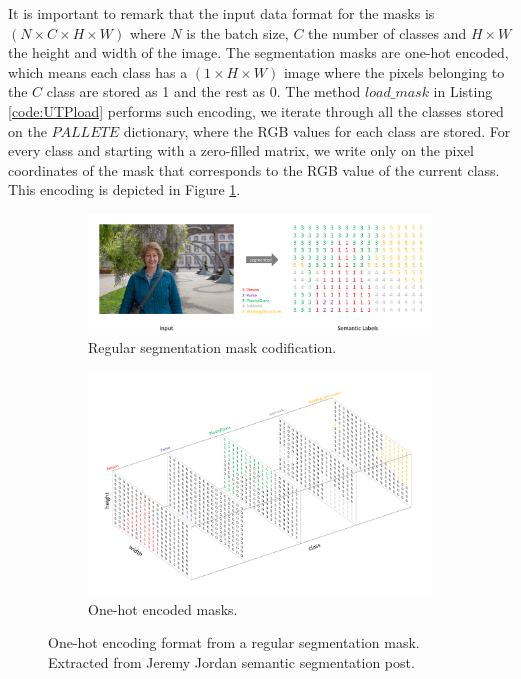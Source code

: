 It is important to remark that the input data format for the masks is $(N \times C \times H \times W)$ where $N$ is the batch size, $C$ the number of classes and $H \times W$ the height and width of the image. The segmentation masks are one-hot encoded, which means each class has a $(1 \times H \times W)$ image where the pixels belonging to the $C$ class are stored as 1 and the rest as 0. The method $load\_mask$ in Listing \ref{code:UTPload} performs such encoding, we iterate through all the classes stored on the $PALLETE$ dictionary, where the RGB values for each class are stored. For every class and starting with a zero-filled matrix, we write only on the pixel coordinates of the mask that corresponds to the RGB value of the current class. This encoding is depicted in Figure \ref{fig:onehot}.

\begin{figure}[h]
	\centering
	
	\begin{subfigure}[b]{0.7\textwidth}
		\includegraphics[width=1\linewidth]{archivos/segmentation_encoding.png}
		\caption{Regular segmentation mask codification.}
	\end{subfigure}
	
	\begin{subfigure}[b]{0.5\textwidth}
		\includegraphics[width=1\linewidth]{archivos/segmentation_encoding2.png}
		\caption{One-hot encoded masks.}
	\end{subfigure}
	
	\caption[One-hot encoding format from a regular segmentation mask.]{One-hot encoding format from a regular segmentation mask. Extracted from Jeremy Jordan semantic segmentation post\footnotemark.}
	\label{fig:onehot}
\end{figure}

